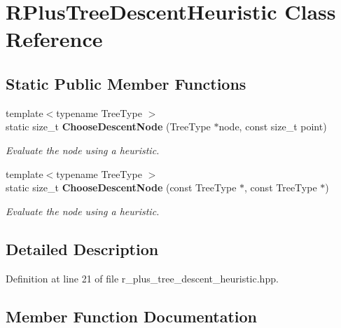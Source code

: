 \section{R\+Plus\+Tree\+Descent\+Heuristic Class Reference}
\label{classmlpack_1_1tree_1_1RPlusTreeDescentHeuristic}
\subsection*{Static Public Member Functions}
\begin{DoxyCompactItemize}
\item 
{\footnotesize template$<$typename Tree\+Type $>$ }\\static size\+\_\+t \textbf{ Choose\+Descent\+Node} (Tree\+Type $\ast$node, const size\+\_\+t point)
\begin{DoxyCompactList}\small\item\em Evaluate the node using a heuristic. \end{DoxyCompactList}\item 
{\footnotesize template$<$typename Tree\+Type $>$ }\\static size\+\_\+t \textbf{ Choose\+Descent\+Node} (const Tree\+Type $\ast$, const Tree\+Type $\ast$)
\begin{DoxyCompactList}\small\item\em Evaluate the node using a heuristic. \end{DoxyCompactList}\end{DoxyCompactItemize}


\subsection{Detailed Description}


Definition at line 21 of file r\+\_\+plus\+\_\+tree\+\_\+descent\+\_\+heuristic.\+hpp.



\subsection{Member Function Documentation}
\mbox{\label{classmlpack_1_1tree_1_1RPlusTreeDescentHeuristic_addab0c2e6048c1ca04f964cbd8f4c4e6}} 
